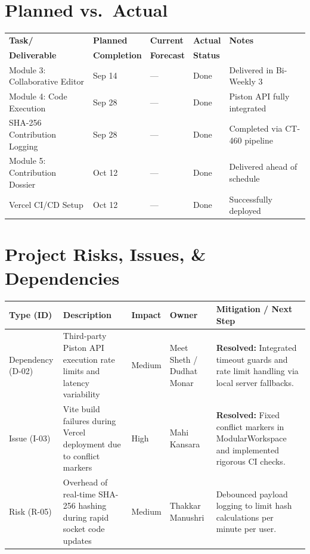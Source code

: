 \documentclass[11pt,a4paper]{article}
\begin{document}
\section{Planned vs.\ Actual}

\begin{tabular}{p{} p{} p{} p{} p{}}
\toprule
\textbf{Task/} & \textbf{Planned} & \textbf{Current} & \textbf{Actual} & \textbf{Notes} \\
\textbf{Deliverable} & \textbf{Completion} & \textbf{Forecast} & \textbf{Status} & \\
\midrule
Module 3: Collaborative Editor & Sep 14 & --- & Done & Delivered in Bi-Weekly 3 \\
Module 4: Code Execution & Sep 28 & --- & Done & Piston API fully integrated \\
SHA-256 Contribution Logging & Sep 28 & --- & Done & Completed via CT-460 pipeline \\
Module 5: Contribution Dossier & Oct 12 & --- & Done & Delivered ahead of schedule \\
Vercel CI/CD Setup & Oct 12 & --- & Done & Successfully deployed \\
\bottomrule
\end{tabular}

\section{Project Risks, Issues, \& Dependencies}

\begin{tabular}{p{} p{} p{} p{} p{}}
\toprule
\textbf{Type (ID)} & \textbf{Description} & \textbf{Impact} & \textbf{Owner} & \textbf{Mitigation / Next Step} \\
\midrule
Dependency (D-02) & Third-party Piston API execution rate limits and latency variability & Medium & Meet Sheth / Dudhat Monar & \textbf{Resolved:} Integrated timeout guards and rate limit handling via local server fallbacks. \\
Issue (I-03) & Vite build failures during Vercel deployment due to conflict markers & High & Mahi Kansara & \textbf{Resolved:} Fixed conflict markers in ModularWorkspace and implemented rigorous CI checks. \\
Risk (R-05) & Overhead of real-time SHA-256 hashing during rapid socket code updates & Medium & Thakkar Manushri & Debounced payload logging to limit hash calculations per minute per user. \\
\bottomrule
\end{tabular}
\end{document}

